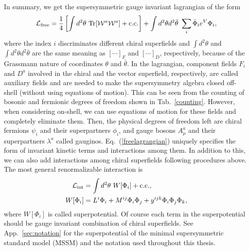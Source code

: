 \documentclass[12pt,twoside,book]{article}
\begin{document}
In summary, we get the supersymmetric gauge invariant lagrangian of
the form
\begin{align}
 \mathcal{L}_{\rm free} = \frac{1}{4} \left[ \int d^2 \theta\ {\rm Tr}
 [\mathcal{W}^a \mathcal{W}^a] + {\rm c.c.} \right] + \int d^2 \theta
 d^2 \bar{\theta}\ \sum_{i} \bar{\Phi}_i e^V
 \Phi_i,\label{freelagrangian}
\end{align}
where the index $i$ discriminates different chiral superfields and
$\int d^2 \theta$ and $\int d^2 \theta d^2 \bar{\theta}$ are the same
meaning as $[\cdots ]_F$ and $[\cdots ]_D$, respectively, because of
the Grassmann nature of coordinates $\theta$ and $\bar{\theta}$.  In
the lagrangian, component fields $F_i$ and $D^a$ involved in the
chiral and the vector superfield, respectively, are called auxiliary
fields and are needed to make the supersymmetry algebra closed
off-shell (without using equations of motion).  This can be seen from
the counting of bosonic and fermionic degrees of freedom shown in
Tab.\ \ref{counting}.  However, when considering on-shell, we can use equations of
motion for these fields and completely eliminate them.  Then, the
physical degrees of freedom left are chiral fermions $\psi_i$ and
their superpartners $\phi_i$, and gauge bosons $A_\mu^a$ and their
superpartners $\lambda^a$ called gauginos.  Eq.\
(\ref{freelagrangian}) uniquely specifies the form of invariant
kinetic terms and interactions among them.  In addition to this, we
can also add interactions among chiral superfields following
procedures above.  The most general renormalizable interaction is
\begin{align}
 \mathcal{L}_{\rm int} &= \int d^2 \theta\ W[\Phi_i] + {\rm c.c.}, \\
 W[\Phi_i] &= L^i \Phi_i + M^{ij} \Phi_i \Phi_j + y^{ijk} \Phi_i \Phi_j
 \Phi_k,
\end{align}
where $W[\Phi_i]$ is called superpotential.  Of course each term in
the superpotential should be gauge invariant combination of chiral
superfields.  See App.\ \ref{sec:notation} for the superpotential of
the minimal supersymmetric standard model (MSSM) and the notation
used throughout this thesis.
\end{document}
